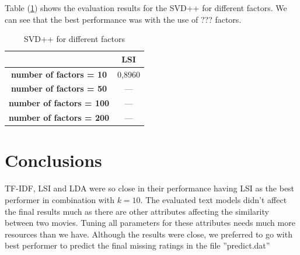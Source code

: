 \documentclass{sigish}
\begin{document}
Table (\ref{tab:svd_02}) shows the evaluation results for the SVD++ for different factors. We can see that the best performance was with the use of ??? factors.

\begin{table}[]
\centering
\begin{tabular}{|c|c|}
\hline
                     & \textbf{LSI} \\ \hline
\textbf{number of factors = 10} & 0,8960        \\ \hline
\textbf{number of factors  = 50} & ---        \\ \hline
\textbf{number of factors  = 100} & ---        \\ \hline
\textbf{number of factors  = 200} & ---        \\ \hline

\end{tabular}
\caption{SVD++ for different factors}
\label{tab:svd_02}
\end{table}

\section{Conclusions}

TF-IDF, LSI and LDA were so close in their performance having LSI as the best performer in combination with $ k = 10 $. The evaluated text models didn't affect the final results much as there are other attributes affecting the similarity between two movies. Tuning all parameters for these attributes needs much more resources than we have. Although the results were close, we preferred to go with best performer to predict the final missing ratings in the file ''predict.dat''



\end{document}
